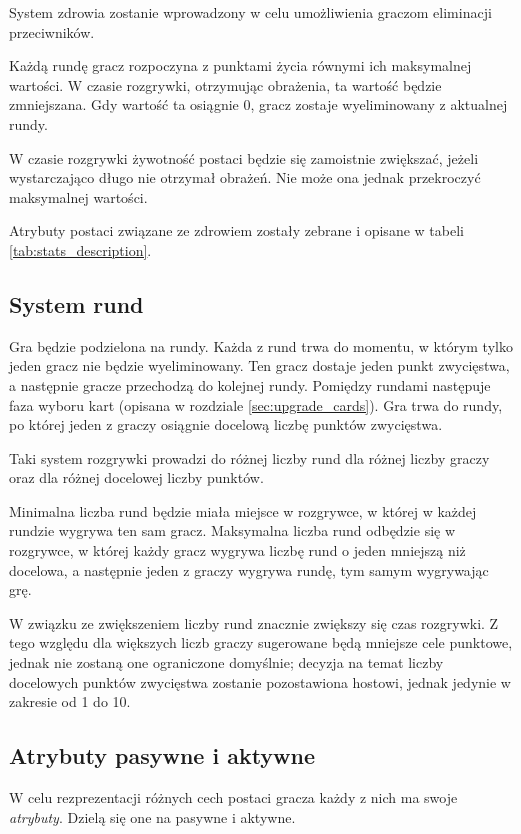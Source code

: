 System zdrowia zostanie wprowadzony w celu umożliwienia graczom eliminacji przeciwników.

Każdą rundę gracz rozpoczyna z punktami życia równymi ich maksymalnej wartości. W czasie rozgrywki, otrzymując obrażenia, ta wartość będzie zmniejszana. Gdy wartość ta osiągnie 0, gracz zostaje wyeliminowany z aktualnej rundy.

W czasie rozgrywki żywotność postaci będzie się zamoistnie zwiększać, jeżeli wystarczająco długo nie otrzymał obrażeń. Nie może ona jednak przekroczyć maksymalnej wartości.

Atrybuty postaci związane ze zdrowiem zostały zebrane i opisane w tabeli \ref{tab:stats_description}.

\subsection{System rund}

Gra będzie podzielona na rundy. Każda z rund trwa do momentu, w którym tylko jeden gracz nie będzie wyeliminowany. Ten gracz dostaje jeden punkt zwycięstwa, a następnie gracze przechodzą do kolejnej rundy. Pomiędzy rundami następuje faza wyboru kart (opisana w rozdziale \ref{sec:upgrade_cards}). Gra trwa do rundy, po której jeden z graczy osiągnie docelową liczbę punktów zwycięstwa.

Taki system rozgrywki prowadzi do różnej liczby rund dla różnej liczby graczy oraz dla różnej docelowej liczby punktów. 

Minimalna liczba rund będzie miała miejsce w rozgrywce, w której w każdej rundzie wygrywa ten sam gracz. Maksymalna liczba rund odbędzie się w rozgrywce, w której każdy gracz wygrywa liczbę rund o jeden mniejszą niż docelowa, a następnie jeden z graczy wygrywa rundę, tym samym wygrywając grę.

W związku ze zwiększeniem liczby rund znacznie zwiększy się czas rozgrywki. Z tego względu dla większych liczb graczy sugerowane będą mniejsze cele punktowe, jednak nie zostaną one ograniczone domyślnie; decyzja na temat liczby docelowych punktów zwycięstwa zostanie pozostawiona hostowi, jednak jedynie w zakresie od 1 do 10.

\subsection{Atrybuty pasywne i aktywne}\label{sec:characteristics}

W celu rezprezentacji różnych cech postaci gracza każdy z nich ma swoje \emph{atrybuty}. Dzielą się one na pasywne i aktywne.

